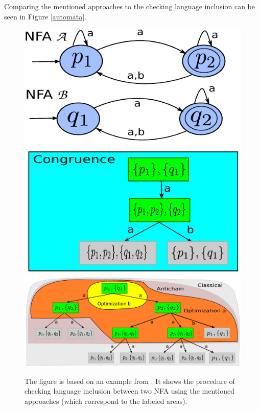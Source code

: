Comparing the mentioned approaches to the checking language inclusion can be seen in Figure \ref{automata}.
\begin{figure}[bt]
\begin{center}
	\scalebox{1}
	{
		\includegraphics[scale=0.5]{fig/congr1.pdf}
		\hspace{0.55cm}
  	\includegraphics[scale=0.5]{fig/ac1.pdf}
	}
  \caption{
      \rm{
      \hspace{0.1cm} The figure is based on an example from \cite{tacas10}.
      It shows the procedure of checking language inclusion between two NFA using the mentioned approaches (which correspond to the labeled areas).
}}
\end{center}
\end{figure}
